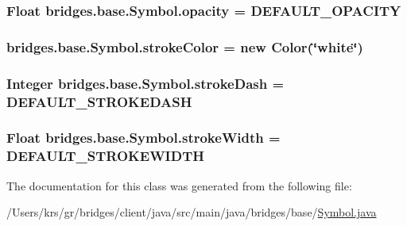 \subsubsection[{opacity}]{\setlength{\rightskip}{0pt plus 5cm}Float bridges.\+base.\+Symbol.\+opacity = D\+E\+F\+A\+U\+L\+T\+\_\+\+O\+P\+A\+C\+I\+T\+Y\hspace{0.3cm}{\ttfamily [protected]}}\label{classbridges_1_1base_1_1_symbol_a7a01e5219d556a24e923885fe1646abb}
\hypertarget{classbridges_1_1base_1_1_symbol_a51a9a36983b00156284d86ca80cccfb0}{}
\subsubsection[{stroke\+Color}]{ bridges.\+base.\+Symbol.\+stroke\+Color = new {\bf Color}(\char`\"{}white\char`\"{})\hspace{0.3cm}{\ttfamily [protected]}}\label{classbridges_1_1base_1_1_symbol_a51a9a36983b00156284d86ca80cccfb0}
\hypertarget{classbridges_1_1base_1_1_symbol_a04134e835474c4747e334389f00513c0}{}
\subsubsection[{stroke\+Dash}]{\setlength{\rightskip}{0pt plus 5cm}Integer bridges.\+base.\+Symbol.\+stroke\+Dash = D\+E\+F\+A\+U\+L\+T\+\_\+\+S\+T\+R\+O\+K\+E\+D\+A\+S\+H\hspace{0.3cm}{\ttfamily [protected]}}\label{classbridges_1_1base_1_1_symbol_a04134e835474c4747e334389f00513c0}
\hypertarget{classbridges_1_1base_1_1_symbol_a9f90a6efb9cb7a2f4e38c46862ae5a95}{}
\subsubsection[{stroke\+Width}]{\setlength{\rightskip}{0pt plus 5cm}Float bridges.\+base.\+Symbol.\+stroke\+Width = D\+E\+F\+A\+U\+L\+T\+\_\+\+S\+T\+R\+O\+K\+E\+W\+I\+D\+T\+H\hspace{0.3cm}{\ttfamily [protected]}}\label{classbridges_1_1base_1_1_symbol_a9f90a6efb9cb7a2f4e38c46862ae5a95}


The documentation for this class was generated from the following file\+:\begin{DoxyCompactItemize}
\item 
/\+Users/krs/gr/bridges/client/java/src/main/java/bridges/base/\hyperlink{_symbol_8java}{Symbol.\+java}\end{DoxyCompactItemize}
